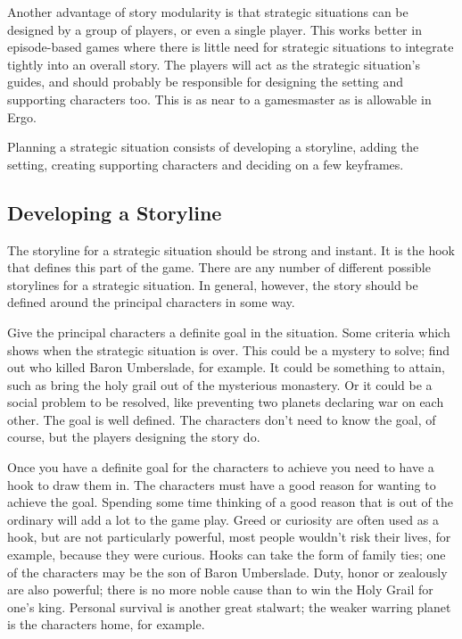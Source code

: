 \documentclass[twoside]{book}
\begin{document}
Another advantage of story modularity is that strategic situations can
be designed by a group of players, or even a single player. This works
better in episode-based games where there is little need for strategic
situations to integrate tightly into an overall story. The players
will act as the strategic situation's guides, and should probably be
responsible for designing the setting and supporting characters
too. This is as near to a gamesmaster as is allowable in Ergo.

Planning a strategic situation consists of developing a storyline,
adding the setting, creating supporting characters and deciding on a
few keyframes.

\subsection{Developing a Storyline}

The storyline for a strategic situation should be strong and
instant. It is the hook that defines this part of the game. There are
any number of different possible storylines for a strategic
situation. In general, however, the story should be defined around the
principal characters in some way.

Give the principal characters a definite goal in the situation. Some
criteria which shows when the strategic situation is over. This could
be a mystery to solve; find out who killed Baron Umberslade, for
example. It could be something to attain, such as bring the holy grail
out of the mysterious monastery. Or it could be a social problem to be
resolved, like preventing two planets declaring war on each other. The
goal is well defined. The characters don't need to know the goal, of
course, but the players designing the story do.

Once you have a definite goal for the characters to achieve you need
to have a hook to draw them in. The characters must have a good reason
for wanting to achieve the goal. Spending some time thinking of a good
reason that is out of the ordinary will add a lot to the game
play. Greed or curiosity are often used as a hook, but are not
particularly powerful, most people wouldn't risk their lives, for
example, because they were curious. Hooks can take the form of family
ties; one of the characters may be the son of Baron Umberslade. Duty,
honor or zealously are also powerful; there is no more noble cause
than to win the Holy Grail for one's king. Personal survival is
another great stalwart; the weaker warring planet is the characters
home, for example.
\end{document}
